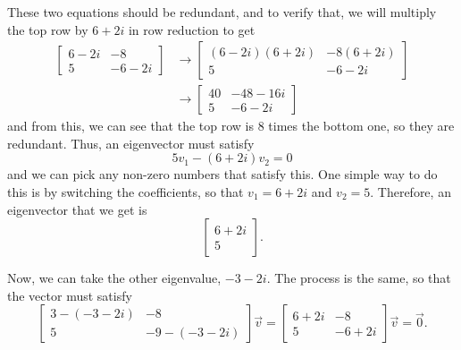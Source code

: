 \documentclass{ximera}
\begin{document}
\begin{exampleSol}
These two equations should be redundant, and to verify that, we will multiply the top row by $6+2i$ in row reduction to get
\[ 
    \begin{split}
        \begin{bmatrix} 
            6-2i & -8 \\ 
            5 & -6-2i 
        \end{bmatrix} 
        &\rightarrow  
        \begin{bmatrix} 
            (6-2i)(6+2i) & -8(6+2i) \\ 
            5 & -6-2i 
        \end{bmatrix} \\
        &\rightarrow 
        \begin{bmatrix} 
            40 & -48 - 16i \\ 
            5 & -6-2i 
        \end{bmatrix}
    \end{split} 
\] 
and from this, we can see that the top row is 8 times the bottom one, so they are redundant. Thus, an eigenvector must satisfy 
\[
    5v_1- (6+2i)v_2 = 0 
\] 
and we can pick any non-zero numbers that satisfy this. One simple way to do this is by switching the coefficients, so that $v_1 = 6+2i$ and $v_2 = 5$. Therefore, an eigenvector that we get is 
\[ 
    \begin{bmatrix} 
        6+2i \\ 
        5 
    \end{bmatrix}. 
\]

Now, we can take the other eigenvalue, $-3-2i$. The process is the same, so that the vector must satisfy
\[
    \begin{bmatrix} 
        3-(-3-2i) & -8 \\ 
        5 & -9-(-3-2i) 
    \end{bmatrix}
    \vec{v} = 
    \begin{bmatrix} 
        6+2i & -8 \\ 
        5 & -6+2i 
    \end{bmatrix}
    \vec{v} = \vec{0}. 
\]


\end{exampleSol}
\end{document}
